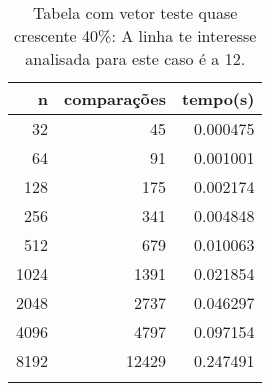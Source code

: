 \begin{table}[ht]
\centering
\begin{tabular}{rrr} \toprule
        n &    comparações &       tempo(s) \\ \midrule
      32  &             45 &      0.000475 \\
      64  &             91 &      0.001001 \\
     128  &            175 &      0.002174 \\
     256  &            341 &      0.004848 \\
     512  &            679 &      0.010063 \\
    1024  &           1391 &      0.021854 \\
    2048  &           2737 &      0.046297 \\
    4096  &           4797 &      0.097154 \\
    8192  &          12429 &      0.247491 \\
\bottomrule\addlinespace
\end{tabular}
\caption{Tabela com vetor teste quase crescente 40\%: A linha te interesse analisada para este caso é a 12.}
\label{tab:quicksortQuaseCresc40}
\end{table}
